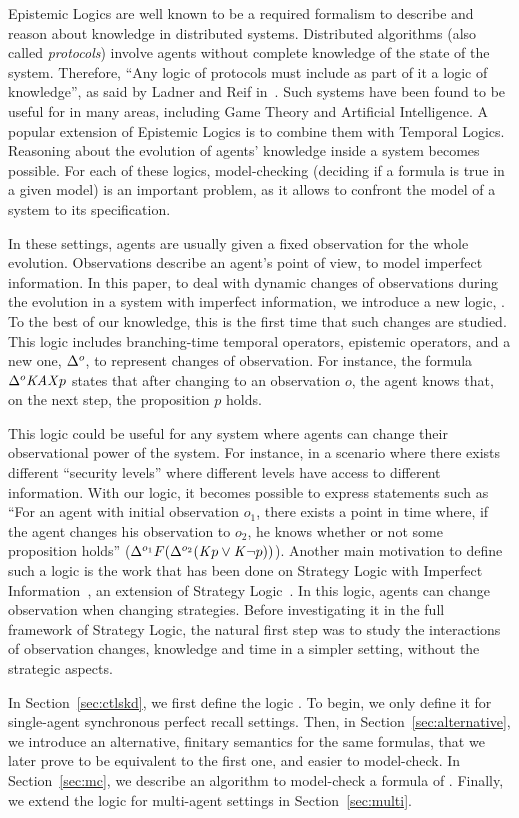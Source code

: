 Epistemic Logics are well known to be a required formalism to describe and reason about knowledge in distributed systems. Distributed algorithms (also called \textit{protocols}) involve agents without complete knowledge of the state of the system. Therefore, ``Any logic of protocols must include as part of it a logic of knowledge'', as said by Ladner and Reif in~\cite{DBLP:conf/tark/LadnerR86}.
Such systems have been found to be useful for in many areas, including Game Theory and Artificial Intelligence.
A popular extension of Epistemic Logics is to combine them with Temporal Logics. Reasoning about the evolution of agents' knowledge inside a system becomes possible. For each of these logics, model-checking (deciding if a formula is true in a given model) is an important problem, as it allows to confront the model of a system to its specification.

In these settings, agents are usually given a fixed observation for the whole evolution. Observations describe an agent's point of view, to model imperfect information.
In this paper, to deal with dynamic changes of observations during the evolution in a system with imperfect information, we introduce a new logic, \ctlskd. To the best of our knowledge, this is the first time that such changes are studied. This logic includes branching-time temporal operators, epistemic operators, and a new one, $\Delta^{o}$, to represent changes of observation. For instance, the formula $\Delta^{o}\mathit{K}\mathit{A}\mathit{X} p$ states that after changing to an observation $o$, the agent knows that, on the next step, the proposition $p$ holds.


This logic could be useful for any system where agents can change their observational power of the system. For instance, in a scenario where there exists different ``security levels'' where different levels have access to different information. With our logic, it becomes possible to express statements such as ``For an agent with initial observation $o_1$, there exists a point in time where, if the agent changes his observation to $o_2$, he knows whether or not some proposition holds'' ($\Delta^{o_1}F(\Delta^{o_2}(\mathit{K} p\vee\mathit{K}\neg p))$).
Another main motivation to define such a logic is the work that has been done on Strategy Logic with Imperfect Information~\cite{DBLP:conf/lics/BerthonMMRV17}, an extension of Strategy Logic~\cite{DBLP:journals/iandc/ChatterjeeHP10}. In this logic, agents can change observation when changing strategies.
Before investigating it in the full framework of Strategy Logic, the natural first step was to study the interactions of observation changes, knowledge and time in a simpler setting, without the strategic aspects.

In Section~\ref{sec:ctlskd}, we first define the logic \ctlskd. To begin, we only define it for single-agent synchronous perfect recall settings.
Then, in Section~\ref{sec:alternative}, we introduce an alternative, finitary semantics for the same formulas, that we later prove to be equivalent to the first one, and easier to model-check.
In Section~\ref{sec:mc}, we describe an algorithm to model-check a formula of \ctlskd.
Finally, we extend the logic for multi-agent settings in Section~\ref{sec:multi}.
